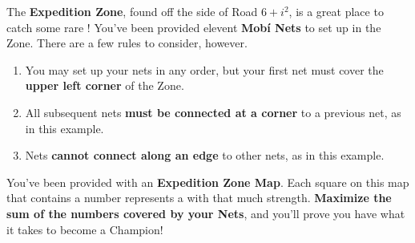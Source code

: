 

The \textbf{Expedition Zone}, found off the side of
Road \(6+i^2\), is a great place to catch some rare \mappMobimon{}!
You've been provided elevent \textbf{Mob\'i Nets}
to set up in the Zone. There are a few rules to consider, however.

\begin{enumerate}
\item You may set up your nets in any order, but your first net must cover
      the \textbf{upper left corner} of the Zone.
\item All subsequent nets \textbf{must be connected at a corner}
      to a previous net, as in this example.

\begin{center}
\end{center}

\item Nets \textbf{cannot connect along an edge} to other nets,
      as in this example.


\begin{center}
\end{center}
\end{enumerate}

You've been provided with an \textbf{Expedition Zone Map}. Each square
on this map that contains a number represents a \mappMobimon{} with
that much strength.
\textbf{Maximize the sum of the numbers covered by your Nets},
and you'll prove you have what it takes to become a \mappMobimon{} Champion!


